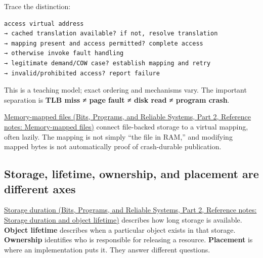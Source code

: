 Trace the distinction:

\begin{verbatim}
access virtual address
→ cached translation available? if not, resolve translation
→ mapping present and access permitted? complete access
→ otherwise invoke fault handling
→ legitimate demand/COW case? establish mapping and retry
→ invalid/prohibited access? report failure
\end{verbatim}

This is a teaching model; exact ordering and mechanisms vary. The important separation is \textbf{TLB miss ≠ page fault ≠ disk read ≠ program crash}.

\href{../01-Bits-Programs-and-Reliable-Systems-P02/main.pdf\#nameddest=appendix-313ee7a0ba7b}{Memory-mapped files (Bits, Programs, and Reliable Systems, Part 2, Reference notes: Memory-mapped files)} connect file-backed storage to a virtual mapping, often lazily. The mapping is not simply ``the file in RAM,'' and modifying mapped bytes is not automatically proof of crash-durable publication.

\subsection{Storage, lifetime, ownership, and placement are different axes}\label{05-engine-i-ch002-storage-lifetime-ownership-and-placement-are-different-axes}

\hypertarget{05-engine-i-ch002-storage-lifetime-ownership-and-placement-are-different-axes}{}

\href{../01-Bits-Programs-and-Reliable-Systems-P02/main.pdf\#nameddest=appendix-0b104bcba06b}{Storage duration (Bits, Programs, and Reliable Systems, Part 2, Reference notes: Storage duration and object lifetime)} describes how long storage is available. \textbf{Object lifetime} describes when a particular object exists in that storage. \textbf{Ownership} identifies who is responsible for releasing a resource. \textbf{Placement} is where an implementation puts it. They answer different questions.

